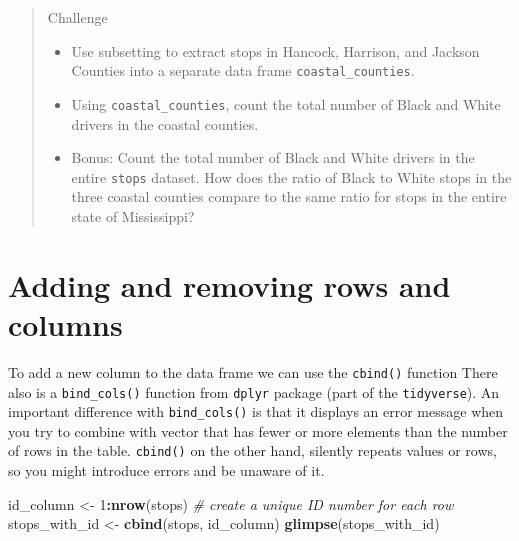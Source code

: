 \documentclass[
]{book}
\newenvironment{Shaded}{\begin{snugshade}}{\end{snugshade}}
\newcommand{\CommentTok}[1]{\textcolor[rgb]{0.56,0.35,0.01}{\textit{#1}}}
\newcommand{\DecValTok}[1]{\textcolor[rgb]{0.00,0.00,0.81}{#1}}
\newcommand{\FunctionTok}[1]{\textcolor[rgb]{0.13,0.29,0.53}{\textbf{#1}}}
\newcommand{\NormalTok}[1]{#1}
\newcommand{\OtherTok}[1]{\textcolor[rgb]{0.56,0.35,0.01}{#1}}
\newcommand{\SpecialCharTok}[1]{\textcolor[rgb]{0.81,0.36,0.00}{\textbf{#1}}}
\providecommand{\tightlist}{%
  \setlength{\itemsep}{0pt}\setlength{\parskip}{0pt}}
\begin{document}
\begin{quote}
Challenge

\begin{itemize}
\tightlist
\item
  Use subsetting to extract stops in Hancock, Harrison, and Jackson Counties into a separate data frame \texttt{coastal\_counties}.
\item
  Using \texttt{coastal\_counties}, count the total number of Black and White drivers in the coastal counties.
\item
  Bonus: Count the total number of Black and White drivers in the entire \texttt{stops} dataset. How does the ratio of Black to White stops in the three coastal counties compare to the same ratio for stops in the entire state of Mississippi?
\end{itemize}
\end{quote}

\hypertarget{adding-and-removing-rows-and-columns}{%
\section{Adding and removing rows and columns}\label{adding-and-removing-rows-and-columns}}

To add a new column to the data frame we can use the \texttt{cbind()} function There also is a \texttt{bind\_cols()} function from \texttt{dplyr} package (part of the \texttt{tidyverse}). An important difference with \texttt{bind\_cols()} is that it displays an error message when you try to combine with vector that has fewer or more elements than the number of rows in the table. \texttt{cbind()} on the other hand, silently repeats values or rows, so you might introduce errors and be unaware of it.

\begin{Shaded}
\begin{Highlighting}[]
\NormalTok{id\_column }\OtherTok{\textless{}{-}} \DecValTok{1}\SpecialCharTok{:}\FunctionTok{nrow}\NormalTok{(stops) }\CommentTok{\# create a unique ID number for each row}
\NormalTok{stops\_with\_id }\OtherTok{\textless{}{-}} \FunctionTok{cbind}\NormalTok{(stops, id\_column) }
\FunctionTok{glimpse}\NormalTok{(stops\_with\_id)}
\end{Highlighting}
\end{Shaded}
\end{document}
